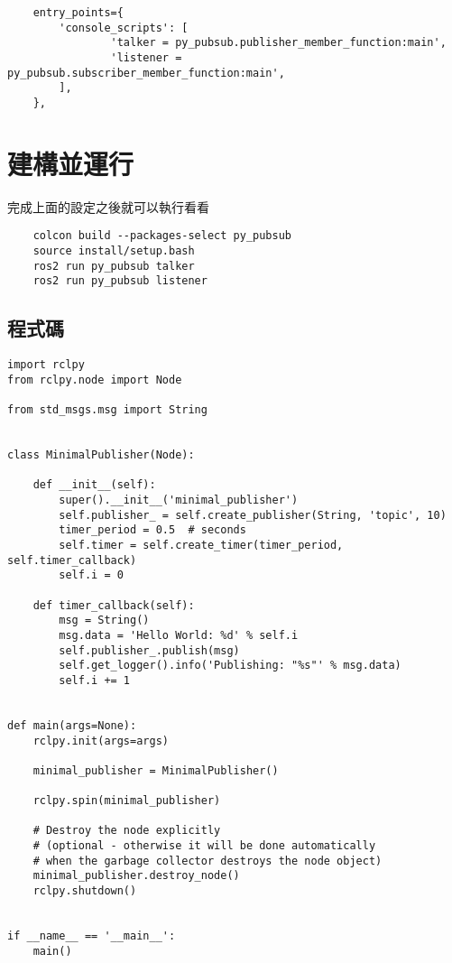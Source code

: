 \begin{verbatim}
    entry_points={
        'console_scripts': [
                'talker = py_pubsub.publisher_member_function:main',
                'listener = py_pubsub.subscriber_member_function:main',
        ],
    },
\end{verbatim}

\section{建構並運行}
完成上面的設定之後就可以執行看看
\begin{verbatim}
    colcon build --packages-select py_pubsub
    source install/setup.bash
    ros2 run py_pubsub talker
    ros2 run py_pubsub listener
\end{verbatim}

\subsection{程式碼}
\begin{verbatim}
import rclpy
from rclpy.node import Node

from std_msgs.msg import String


class MinimalPublisher(Node):

    def __init__(self):
        super().__init__('minimal_publisher')
        self.publisher_ = self.create_publisher(String, 'topic', 10)
        timer_period = 0.5  # seconds
        self.timer = self.create_timer(timer_period, self.timer_callback)
        self.i = 0

    def timer_callback(self):
        msg = String()
        msg.data = 'Hello World: %d' % self.i
        self.publisher_.publish(msg)
        self.get_logger().info('Publishing: "%s"' % msg.data)
        self.i += 1


def main(args=None):
    rclpy.init(args=args)

    minimal_publisher = MinimalPublisher()

    rclpy.spin(minimal_publisher)

    # Destroy the node explicitly
    # (optional - otherwise it will be done automatically
    # when the garbage collector destroys the node object)
    minimal_publisher.destroy_node()
    rclpy.shutdown()


if __name__ == '__main__':
    main()
\end{verbatim}
